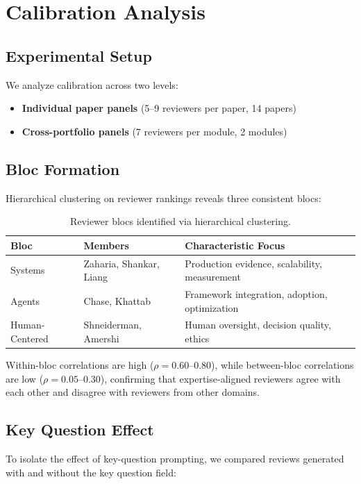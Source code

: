 \section{Calibration Analysis}

\subsection{Experimental Setup}

We analyze calibration across two levels:
\begin{itemize}
    \item \textbf{Individual paper panels} (5--9 reviewers per paper, 14 papers)
    \item \textbf{Cross-portfolio panels} (7 reviewers per module, 2 modules)
\end{itemize}

\subsection{Bloc Formation}

Hierarchical clustering on reviewer rankings reveals three consistent blocs:

\begin{table}[h]
\centering
\small
\begin{tabular}{lll}
\toprule
Bloc & Members & Characteristic Focus \\
\midrule
Systems & Zaharia, Shankar, Liang & Production evidence, scalability, measurement \\
Agents & Chase, Khattab & Framework integration, adoption, optimization \\
Human-Centered & Shneiderman, Amershi & Human oversight, decision quality, ethics \\
\bottomrule
\end{tabular}
\caption{Reviewer blocs identified via hierarchical clustering.}
\end{table}

Within-bloc correlations are high ($\rho = 0.60$--$0.80$), while between-bloc correlations are low ($\rho = 0.05$--$0.30$), confirming that expertise-aligned reviewers agree with each other and disagree with reviewers from other domains.

\subsection{Key Question Effect}

To isolate the effect of key-question prompting, we compared reviews generated with and without the key question field:

